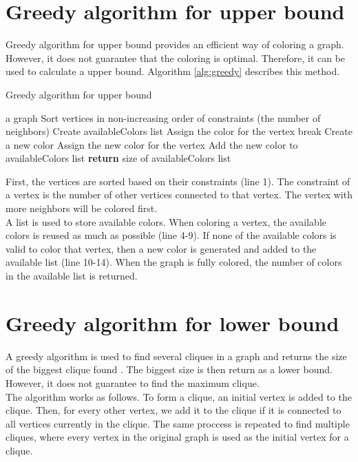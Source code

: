 \documentclass[a4paper]{report}
\begin{document}
		\section{Greedy algorithm for upper bound}
		Greedy algorithm for upper bound provides an efficient way of coloring a graph. However, it does not guarantee that the coloring is optimal. Therefore, it can be used to calculate a upper bound. Algorithm \ref{alg:greedy} \cite{jensen2011graph} describes this method.\\
		\begin{algorithm}
			\caption{Greedy algorithm for upper bound}
			\label{alg:greedy}
			\begin{algorithmic}[1]
				\REQUIRE a graph
				\STATE Sort vertices in non-increasing order of constraints (the number of neighbors)
				\STATE Create availableColors list
					\STATE Assign the color for the vertex
					\STATE break
					\ENDIF
					\ENDFOR
					\STATE Create a new color
					\STATE Assign the new color for the vertex
					\STATE Add the new color to availableColors list
					\ENDIF
				\ENDFOR
				\STATE \textbf{return} size of availableColors list
			\end{algorithmic}
		\end{algorithm}
		First, the vertices are sorted based on their constraints (line 1). The constraint of a vertex is the number of other vertices connected to that vertex. The vertex with more neighbors will be colored first.\\
		A list is used to store available colors. When coloring a vertex, the available colors is reused as much as possible (line 4-9). If none of the available colors is valid to color that vertex, then a new color is generated and added to the available list (line 10-14). When the graph is fully colored, the number of colors in the available list is returned.\\
		
		\section{Greedy algorithm for lower bound}
		A greedy algorithm is used to find several cliques in a graph and returns the size of the biggest clique found \cite{steven2008algorithm}. The biggest size is then return as a lower bound. However, it does not guarantee to find the maximum clique. \\
		The algorithm works as follows. To form a clique, an initial vertex is added to the clique. Then, for every other vertex, we add it to the clique if it is connected to all vertices currently in the clique. The same proccess is repeated to find multiple cliques, where every vertex in the original graph is used as the initial vertex for a clique. 
		
\end{document}
